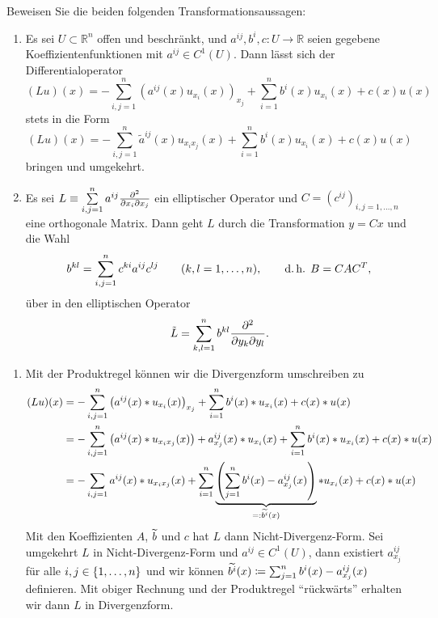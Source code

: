\begin{exercisePage}
	
	\begin{task}
		Beweisen Sie die beiden folgenden Transformationsaussagen:
		\begin{enumerate}
			\item Es sei $U\subset\mathbb R^n$ offen und beschränkt, und $a^{ij}, b^i, c \colon U\to\mathbb R$ seien gegebene 
			Koeffizientenfunktionen mit $a^{ij}\in C^1(U)$. Dann lässt sich der Differentialoperator
			\begin{equation*}
				(Lu)(x)= -\sum\limits_{i,j=1}^n(a^{ij}(x)u_{x_i}(x))_{x_j} 
				+\sum\limits_{i=1}^n b^i(x)u_{x_i}(x)
				+c(x)u(x)
			\end{equation*}
			stets in die Form
			\begin{equation*}
				(Lu)(x)= -\sum\limits_{i,j=1}^n \tilde a^{ij}(x)u_{x_ix_j} (x) 
				+\sum\limits_{i=1}^n b^i(x)u_{x_i}(x)
				+c(x)u(x)
			\end{equation*}
			bringen und umgekehrt.
			\item Es sei $L \equiv \sum\limits_{i,j=1}^n a^{ij} {\partial^2\over \partial x_i\partial x_j}$ ein elliptischer Operator und $C=(c^{ij})_{i,j=1,\ldots, n}$ eine orthogonale Matrix. Dann geht $L$ durch die Transformation $y=Cx$ und die Wahl
			\begin{equation*}
				b^{kl}=\sum\limits_{i,j=1}^n c^{ki}a^{ij}c^{lj} \qquad (k,l=1,\ldots, n),\qquad\text{d.\,h. }B = CAC^T,
			\end{equation*}
			über in den elliptischen Operator
			\begin{equation*}
				\tilde L=\sum\limits_{k,l =1}^n b^{kl} {\partial^2\over \partial y_k\partial y_l}.
			\end{equation*}
		\end{enumerate}
	\end{task}

	\begin{enumerate}[label=(zu \alph*), leftmargin=*]
		\item Mit der Produktregel können wir die Divergenzform umschreiben zu
		\begin{align*}
			(Lu)(x) &= - \sum_{i,j=1}^n \left( a^{ij}(x) * u_{x_i}(x) \right)_{x_j} + \sum_{i = 1}^n b^i(x) * u_{x_i}(x) + c(x) * u(x) \\
			&= - \sum_{i,j=1}^n \left( a^{ij}(x) * u_{x_i x_j}(x) \right) + a^{ij}_{x_j}(x) * u_{x_i}(x) + \sum_{i = 1}^n b^i(x) * u_{x_i}(x) + c(x) * u(x) \\
			&= - \sum_{i,j=1} a^{ij}(x) * u_{x_i x_j} (x) + \sum_{i = 1}^n \underbrace{\left( \sum_{j = 1}^n b^i(x) - a^{ij}_{x_j}(x) \right)}_{\mathrel{=:} \widetilde{b^i}(x)} * u_{x_i} (x) + c(x) * u(x)
		\end{align*}
		Mit den Koeffizienten $A$, $\widetilde{b}$ und $c$ hat $L$ dann Nicht-Divergenz-Form. 
		Sei umgekehrt $L$ in Nicht-Divergenz-Form und $a^{ij} \in C^1(U)$, dann existiert $a^{ij}_{x_j}$ für alle $i,j \in \left\{ 1, \dots, n \right\}$ und wir können $\widetilde{b^i}(x) \coloneqq \sum_{j = 1}^n b^i(x) - a^{ij}_{x_j}(x)$ definieren. Mit obiger Rechnung und der Produktregel \enquote{rückwärts} erhalten wir dann $L$ in Divergenzform.
	\end{enumerate}
\end{exercisePage}